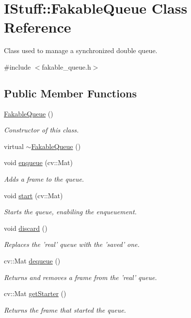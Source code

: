 \hypertarget{class_i_stuff_1_1_fakable_queue}{\section{I\-Stuff\-:\-:Fakable\-Queue Class Reference}
\label{class_i_stuff_1_1_fakable_queue}
}


Class used to manage a synchronized double queue.  




{\ttfamily \#include $<$fakable\-\_\-queue.\-h$>$}

\subsection*{Public Member Functions}
\begin{DoxyCompactItemize}
\item 
\hyperlink{class_i_stuff_1_1_fakable_queue_a22906efd165f0becf24bc4056b966fb6}{Fakable\-Queue} ()
\begin{DoxyCompactList}\small\item\em Constructor of this class. \end{DoxyCompactList}\item 
virtual \hyperlink{class_i_stuff_1_1_fakable_queue_a9675cd13bcaa59d614d47127c0c21d93}{$\sim$\-Fakable\-Queue} ()
\item 
void \hyperlink{class_i_stuff_1_1_fakable_queue_a2d615a3f5fb3bbe26bd99694bd1a2378}{enqueue} (cv\-::\-Mat)
\begin{DoxyCompactList}\small\item\em Adds a frame to the queue. \end{DoxyCompactList}\item 
void \hyperlink{class_i_stuff_1_1_fakable_queue_acb05a50ab738a9df2cccf7b697c199ca}{start} (cv\-::\-Mat)
\begin{DoxyCompactList}\small\item\em Starts the queue, enabiling the enqueuement. \end{DoxyCompactList}\item 
void \hyperlink{class_i_stuff_1_1_fakable_queue_a5f103ad2380d4aaf9c38c8853c3c97a9}{discard} ()
\begin{DoxyCompactList}\small\item\em Replaces the 'real' queue with the 'saved' one. \end{DoxyCompactList}\item 
cv\-::\-Mat \hyperlink{class_i_stuff_1_1_fakable_queue_a45d9c3549edcd23c87d70142db01df05}{dequeue} ()
\begin{DoxyCompactList}\small\item\em Returns and removes a frame from the 'real' queue. \end{DoxyCompactList}\item 
cv\-::\-Mat \hyperlink{class_i_stuff_1_1_fakable_queue_aea66bd432f26ee1322387dc5589b721d}{get\-Starter} ()
\begin{DoxyCompactList}\small\item\em Returns the frame that started the queue. \end{DoxyCompactList}\end{DoxyCompactItemize}
